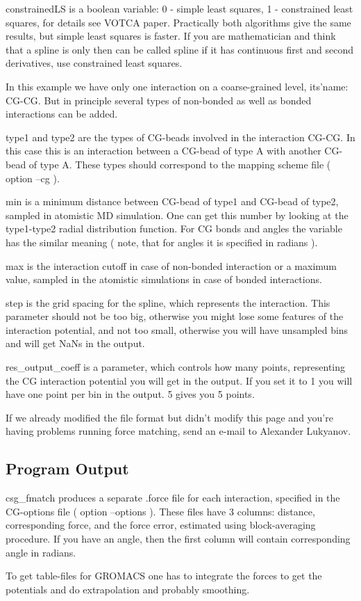 constrainedLS is a boolean variable: 0 - simple least squares, 1 - constrained least squares, for details see VOTCA paper.
Practically both algorithms give the same results, but simple least squares is faster. If you are mathematician and think that a spline is only then can be called spline if it has continuous first and second derivatives, use constrained least squares.

In this example we have only one interaction on a coarse-grained level, its'name: CG-CG. But in principle several types of non-bonded as well as bonded interactions can be added. 

type1 and type2 are the types of CG-beads involved in the interaction CG-CG. In this case this is an interaction between a CG-bead of type A with another CG-bead of type A. These types should correspond to the mapping scheme file ( option --cg ).

min is a minimum distance between CG-bead of type1 and CG-bead of type2,  sampled in atomistic MD simulation. One can get this number by looking at the type1-type2 radial distribution function. For CG bonds and angles the variable has the similar meaning ( note, that for angles it is specified in radians ).

max is the interaction cutoff in case of non-bonded interaction or a maximum value, sampled in the atomistic simulations in case of bonded interactions.

step is the grid spacing for the spline, which represents the interaction. This parameter should not be too big, otherwise you might lose some features of the interaction potential, and not too small, otherwise you will have unsampled bins and will get NaNs in the output.

res\_output\_coeff is a parameter, which controls how many points, representing the CG interaction potential you will get in the output. If you set it to 1 you will have one point per bin in the output. 5 gives you 5 points.

If we already modified the file format but didn't modify this page and you're having problems running force matching, send an e-mail to Alexander Lukyanov.

\subsection{Program Output}
csg\_fmatch produces a separate .force file for each interaction, specified in the CG-options file ( option --options ).
These files have 3 columns: distance, corresponding force, and the force error, estimated using block-averaging procedure.
If you have an angle, then the first column will contain corresponding angle in radians.

To get table-files for GROMACS one has to integrate the forces to get the potentials and do extrapolation and probably smoothing.
